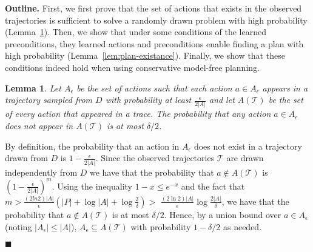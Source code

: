 \documentclass[letterpaper]{article}
\newtheorem{lemma}{Lemma}
\def\sFullBox{\hbox{\vrule width 6pt height 6pt depth 0pt}}
\newcommand{\qqed}{\(\;\;\;\sFullBox\)}
\newenvironment{proof}{\noindent{\bf Proof:~~}}{\qed}
\newenvironment{proof-of-claim}{\noindent{\bf Proof:~~}}{\qqed}
\newcommand{\qed}{\hfill\ensuremath{\blacksquare}}
\newcommand{\MEMO}[1]
{ \fbox{
\begin{minipage}[b]{7.9 cm}
#1
\end{minipage}
} }
\begin{document}
\begin{proof}
{\bf Outline.} First, we first prove that the set of actions that exists in the observed trajectories is sufficient to solve a randomly drawn problem with high probability (Lemma~\ref{lem:sufficientActions}). Then, we show that under some conditions of the learned preconditions, they learned actions and preconditions enable finding a plan with high probability (Lemma~\ref{lem:plan-existance}). Finally, we show that these conditions indeed hold when using  conservative model-free planning. 

\begin{lemma}
Let $A_\epsilon$ be the set of actions such that each action $a\in A_\epsilon$ appears in a trajectory sampled from $D$ with probability at least $\frac{\epsilon}{2|A|}$ 
and let $A(\mathcal{T})$ be the set of every action that appeared in a trace. 
The probability that any action $a\in A_\epsilon$ does not appear in $A(\mathcal{T})$ is at most $\delta/2$.
\label{lem:sufficientActions}
\end{lemma}
\begin{proof-of-claim}
By definition, the probability that an action in $A_\epsilon$ does not exist in a trajectory drawn from $D$ is $1-\frac{\epsilon}{2|A|}$. Since the observed trajectories $\mathcal{T}$ are drawn independently from $D$ we have that the probability that $a\notin A(\mathcal{T})$ is $(1-\frac{\epsilon}{2|A|})^m$. 
Using the inequality $1-x\leq e^{-x}$ and 
the fact that 
$m>\frac{(2ln 2)|A|}{\epsilon}(|P|+\log |A|+\log\frac{2}{\delta})$$>$
$\frac{(2\ln 2)|A|}{\epsilon}\log\frac{2|A|}{\delta}$, we have that the probability that $a\notin A(\mathcal{T})$ is at most $\delta/2$. Hence, by a union bound over $a\in A_\epsilon$ (noting $|A_\epsilon|\leq |A|$), $A_\epsilon\subseteq A(\mathcal{T})$ with probability $1-\delta/2$ as needed.
\end{proof-of-claim}



\end{proof}
\end{document}
